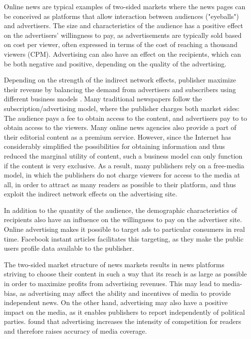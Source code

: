 \documentclass[12pt,a4paper,notitlepage]{article}
\begin{document}
Online news are typical examples of two-sided markets where the news pages can be conceived as platforms that allow interaction between audiences ("eyeballs") and advertisers. The size and characteristics of the audience has a positive effect on the advertisers' willingness to pay, as advertisements are typically sold based on cost per viewer, often expressed in terms of the cost of reaching a thousand viewers (CPM). Advertising can also have an effect on the recipients, which can be both negative and positive, depending on the quality of the advertising. 

Depending on the strength of the indirect network effects, publisher maximize their revenue by balancing the demand from advertisers and subscribers using different business models \citep{evans_economics_2008}. Many traditional newspapers follow the subscription/advertising model, where the publisher charges both market sides: The audience pays a fee to obtain access to the content, and advertisers pay to to obtain access to the viewers. Many online news agencies also provide a part of their editorial content as a premium service. However, since the Internet has considerably simplified the possibilities for obtaining information and thus reduced the marginal utility of content, such a business model can only function if the content is very exclusive. As a result, many publishers rely on a free-media model, in which the publishers do not charge viewers for access to the media at all, in order to attract as many readers as possible to their platform, and thus exploit the indirect network effects on the advertising site. %

In addition to the quantity of the audience, the demographic characteristics of recipients also have an influence on the willingness to pay on the advertiser site. Online advertising makes it possible to target ads to particular consumers in real time. Facebook instant articles facilitates this targeting, as they make the public users profile data available to the publisher. 

The two-sided market structure of news markets results in news platforms striving to choose their content in such a way that its reach is as large as possible in order to maximize profits from advertising revenues. This may lead to media-bias, as advertising may affect the ability and incentives of media to provide independent news. On the other hand, advertising may also have a positive impact on the media, as it enables publishers to report independently of political parties. \citet{ellman_what_2009} found that advertising increases the intensity of competition for readers and therefore raises accuracy of media coverage.  
\end{document}
